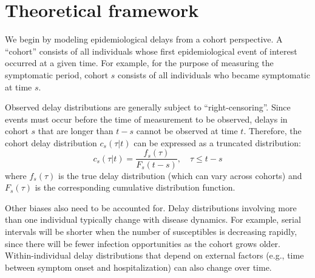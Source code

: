 \documentclass[12pt]{article}
\begin{document}
\section{Theoretical framework}

We begin by modeling epidemiological delays from a cohort perspective.
A ``cohort'' consists of all individuals whose first epidemiological event of interest occurred at a given time.
For example, for the purpose of measuring the symptomatic period, cohort $s$ consists of all individuals who became symptomatic at time $s$.

Observed delay distributions are generally subject to ``right-censoring''.
Since events must occur before the time of measurement to be observed, delays in cohort $s$ that are longer than $t-s$ cannot be observed at time $t$.
Therefore, the cohort delay distribution $c_s(\tau|t)$ can be expressed as a truncated distribution:
\begin{equation}
c_s(\tau|t) = \frac{f_s(\tau)}{F_s(t-s)},\quad \tau \leq t-s
\end{equation}
where $f_s(\tau)$ is the true delay distribution (which can vary across cohorts) and $F_s(\tau)$ is the corresponding cumulative distribution function.

Other biases also need to be accounted for. Delay distributions involving more than one individual typically change with disease dynamics. For example, serial intervals will be shorter when the number of susceptibles is decreasing rapidly, since there will be fewer infection opportunities as the cohort grows older.
Within-individual delay distributions that depend on external factors (e.g., time between symptom onset and hospitalization) can also change over time.
\end{document}
